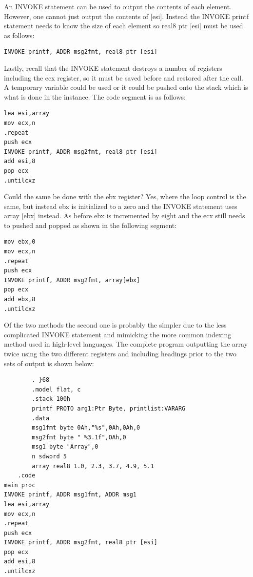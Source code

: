 \documentclass[10pt]{book}
\begin{document}
\begin{center}
\begin{center}
\begin{center}
\begin{center}
An INVOKE statement can be used to output the contents of each element. However, one cannot just output the contents of [esi]. Instead the INVOKE printf statement needs to know the size of each element so real8 ptr [esi] must be used as follows:

\begin{verbatim}
INVOKE printf, ADDR msg2fmt, real8 ptr [esi]
\end{verbatim}

Lastly, recall that the INVOKE statement destroys a number of registers including the ecx register, so it must be saved before and restored after the call. A temporary variable could be used or it could be pushed onto the stack which is what is done in the instance. The code segment is as follows:

\begin{verbatim}
lea esi,array
mov ecx,n
.repeat
push ecx
INVOKE printf, ADDR msg2fmt, real8 ptr [esi]
add esi,8
pop ecx
.untilcxz
\end{verbatim}

Could the same be done with the ebx register? Yes, where the loop control is the same, but instead ebx is initialized to a zero and the INVOKE statement uses array [ebx] instead. As before ebx is incremented by eight and the ecx still needs to pushed and popped as shown in the following segment:

\begin{verbatim}
mov ebx,0
mov ecx,n
.repeat
push ecx
INVOKE printf, ADDR msg2fmt, array[ebx]
pop ecx
add ebx,8
.untilcxz
\end{verbatim}

Of the two methods the second one is probably the simpler due to the less complicated INVOKE statement and mimicking the more common indexing method used in high-level languages. The complete program outputting the array twice using the two different registers and including headings prior to the two sets of output is shown below:

\begin{verbatim}
        . }68
        .model flat, c
        .stack 100h
        printf PROTO arg1:Ptr Byte, printlist:VARARG
        .data
        msg1fmt byte 0Ah,"%s",0Ah,0Ah,0
        msg2fmt byte " %3.1f",OAh,0
        msg1 byte "Array",0
        n sdword 5
        array real8 1.0, 2.3, 3.7, 4.9, 5.1
    .code
main proc
INVOKE printf, ADDR msg1fmt, ADDR msg1
lea esi,array
mov ecx,n
.repeat
push ecx
INVOKE printf, ADDR msg2fmt, real8 ptr [esi]
pop ecx
add esi,8
.untilcxz
\end{verbatim}


\end{center}
\end{center}
\end{center}
\end{center}
\end{document}
